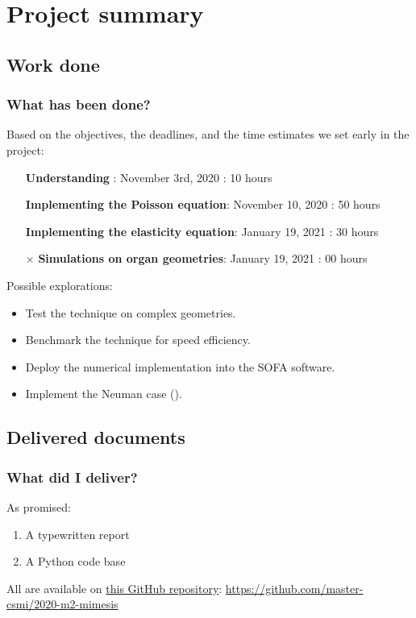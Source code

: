 


\section{Project summary}

\subsection{Work done}

\begin{frame}
    \frametitle{What has been done?}
    Based on the objectives, the deadlines, and the time estimates we set early in the project:
    \begin{itemize}
        \item[\checkmark] \textbf{Understanding \phifem}: November 3rd, 2020 : \alert{10 hours}  \pause
        \item[\checkmark] \textbf{Implementing the Poisson equation}: November 10, 2020 : \alert{50 hours} \pause
        \item[\checkmark] \textbf{Implementing the elasticity equation}: January 19, 2021 : \alert{30 hours}  \pause
        \item[$\times$] \textbf{Simulations on organ geometries}: January 19, 2021 : \alert{00 hours} \pause
    \end{itemize}
    
    Possible explorations:
    \begin{itemize}
        \item Test the technique on complex geometries. \pause
        \item Benchmark the technique for speed efficiency. \pause
        \item Deploy the numerical implementation into the SOFA software. \pause
        \item Implement the Neuman case (\cite{Reference4}).
    \end{itemize}

\end{frame}



\subsection{Delivered documents}
\begin{frame}
    \frametitle{What did I deliver?}
    As promised:
    \begin{enumerate}
        \item A typewritten report \pause
        \item A Python code base
    \end{enumerate}
    All are available on \href{https://github.com/master-csmi/2020-m2-mimesis}{this GitHub repository}: \url{https://github.com/master-csmi/2020-m2-mimesis} 
\end{frame}
